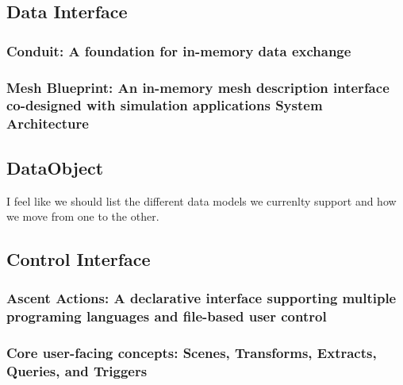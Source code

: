 \subsection{Data Interface}
\subsubsection{Conduit: A foundation for in-memory data exchange}

\subsubsection{Mesh Blueprint: An in-memory mesh description interface co-designed with simulation applications
System Architecture}

\subsection{DataObject}

I feel like we should list the different data models we currenlty support and how we
move from one to the other.

\subsection{Control Interface}

\subsubsection{Ascent Actions: A declarative interface supporting multiple programing languages and file-based user control}

\subsubsection{Core user-facing concepts: Scenes, Transforms, Extracts, Queries, and Triggers}
